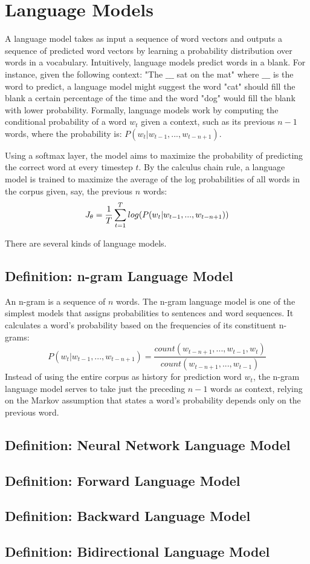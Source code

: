 \section{Language Models}

A language model takes as input a sequence of word vectors and outputs a sequence of predicted word vectors by learning a probability distribution over words in a vocabulary. 
Intuitively, language models predict words in a blank. For instance, given the following context: "The $\_\_\_$ sat on the mat" where $\_\_\_$ is the word to predict, a language model might suggest the word "cat" should fill the blank a certain percentage of the time and the word "dog" would fill the blank with lower probability. 
Formally, language models work by computing the conditional probability of a word $w_t$ given a context, such as its previous $n-1$ words, where the probability is: $P(w_t | w_{t-1}, ..., w_{t-n+1})$. 

Using a softmax layer, the model aims to maximize the probability of predicting the correct word at every timestep $t$. By the calculus chain rule, a language model is trained to maximize the average of the log probabilities of all words in the corpus given, say, the previous $n$ words: 
$$
J_{\theta} = \frac{1}{T} \sum_{t=1}^T log \Large(P(w_t | w_{t-1},..., w_{t-n+1}) \Large)
$$

There are several kinds of language models. 

\subsection{Definition: n-gram Language Model}

An n-gram is a sequence of $n$ words. The n-gram language model is one of the simplest models that assigns probabilities to sentences and word sequences. It calculates a word's probability based on the frequencies of its constituent n-grams: 
$$
P(w_t | w_{t-1}, ..., w_{t-n+1}) = \frac {count(w_{t-n+1},...,w_{t-1},w_t)} {count(w_{t-n+1},...,w_{t-1})}
$$
Instead of using the entire corpus as history for prediction word $w_t$, the n-gram language model serves to take just the preceding $n-1$ words as context, relying on the Markov assumption that states a word's probability depends only on the previous word. 



\subsection{Definition: Neural Network Language Model}

\subsection{Definition: Forward Language Model}

\subsection{Definition: Backward Language Model}

\subsection{Definition: Bidirectional Language Model}